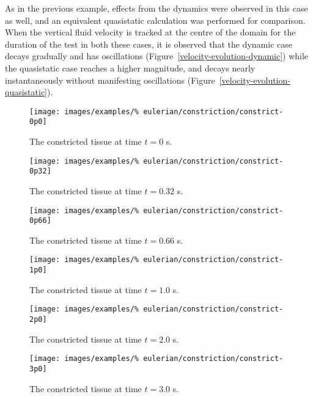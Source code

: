 As in the previous example, effects from the dynamics were observed in
this case as well, and an equivalent quasistatic calculation was
performed for comparison. When the vertical fluid velocity is tracked
at the centre of the domain for the duration of the test in both these
cases, it is observed that the dynamic case decays gradually and has
oscillations (Figure~\ref{velocity-evolution-dynamic}) while the
quasistatic case reaches a higher magnitude, and decays nearly
instantaneously without manifesting oscillations
(Figure~\ref{velocity-evolution-quasistatic}).

\begin{figure}[!hptb]
  \centering
  \texttt{[image: images/examples/\%
    eulerian/constriction/constrict-0p0]}
  \caption{The constricted tissue at time $t=0$ s.} 
  \label{constrict-image-0p0}
\end{figure}

\begin{figure}[!hptb]
  \centering
  \texttt{[image: images/examples/\%
    eulerian/constriction/constrict-0p32]}
  \caption{The constricted tissue at time $t=0.32$ s.} 
  \label{constrict-image-0p32}
\end{figure}

\begin{figure}[!hptb]
  \centering
  \texttt{[image: images/examples/\%
    eulerian/constriction/constrict-0p66]}
  \caption{The constricted tissue at time $t=0.66$ s.} 
  \label{constrict-image-0p66}
\end{figure}

\begin{figure}[!hptb]
  \centering
  \texttt{[image: images/examples/\%
    eulerian/constriction/constrict-1p0]}
  \caption{The constricted tissue at time $t=1.0$ s.} 
  \label{constrict-image-1p0}
\end{figure}

\begin{figure}[!hptb]
  \centering
  \texttt{[image: images/examples/\%
    eulerian/constriction/constrict-2p0]}
  \caption{The constricted tissue at time $t=2.0$ s.} 
  \label{constrict-image-2p0}
\end{figure}

\begin{figure}[!hptb]
  \centering
  \texttt{[image: images/examples/\%
    eulerian/constriction/constrict-3p0]}
  \caption{The constricted tissue at time $t=3.0$ s.} 
  \label{constrict-image-3p0}
\end{figure}

